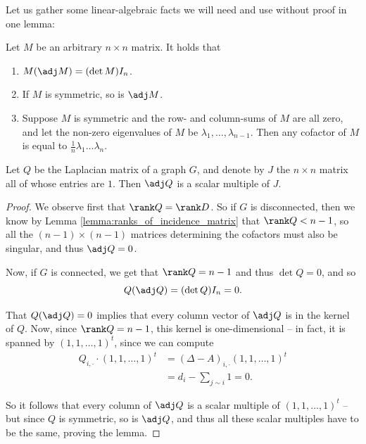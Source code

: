 \documentclass[nobib]{tufte-handout}
\begin{document}
Let us gather some linear-algebraic facts we will need and use without proof in one lemma:

\begin{lemma}\label{lemma:linear_algebra_facts}
    Let $M$ be an arbitrary $n\times n$ matrix. It holds that
    \begin{enumerate}
        \item $M(\adj M) = (\det M)I_n$.
        \item If $M$ is symmetric, so is $\adj M$.
        \item Suppose $M$ is symmetric and the row- and column-sums of $M$ are all zero, and let the non-zero eigenvalues of $M$ be $\lambda_1, \ldots, \lambda_{n-1}$. Then any cofactor of $M$ is equal to $\frac{1}{n}\lambda_1\ldots\lambda_n$.
    \end{enumerate}
\end{lemma}

\begin{lemma}
    Let $Q$ be the Laplacian matrix of a graph $G$, and denote by $J$ the $n\times n$ matrix all of whose entries are $1$. Then $\adj Q$ is a scalar multiple of $J$.

    \begin{proof}
        We observe first that $\rank Q = \rank D$. So if $G$ is disconnected, then we know by Lemma \ref{lemma:ranks_of_incidence_matrix} that $\rank Q < n - 1$, so all the $(n-1)\times(n-1)$ matrices determining the cofactors must also be singular, and thus $\adj Q = 0$.

        Now, if $G$ is connected, we get that $\rank Q = n - 1$ and thus $\det Q = 0$, and so 
        $$Q(\adj Q) = (\det Q)I_n = 0.$$

        That $Q(\adj Q) = 0$ implies that every column vector of $\adj Q$ is in the kernel of $Q$. Now, since $\rank Q = n - 1$, this kernel is one-dimensional -- in fact, it is spanned by $(1,1,\ldots,1)^t$, since we can compute
        \begin{align*}
            Q_{i, \cdot}\cdot(1,1,\ldots,1)^t &= (\Delta - A)_{i, \cdot}(1,1,\ldots,1)^t\\
            &= d_i - \sum_{j \sim i} 1 = 0.
        \end{align*}

        So it follows that every column of $\adj Q$ is a scalar multiple of $(1,1,\ldots,1)^t$ -- but since $Q$ is symmetric, so is $\adj Q$, and thus all these scalar multiples have to be the same, proving the lemma.
    \end{proof}
\end{lemma}
\end{document}
